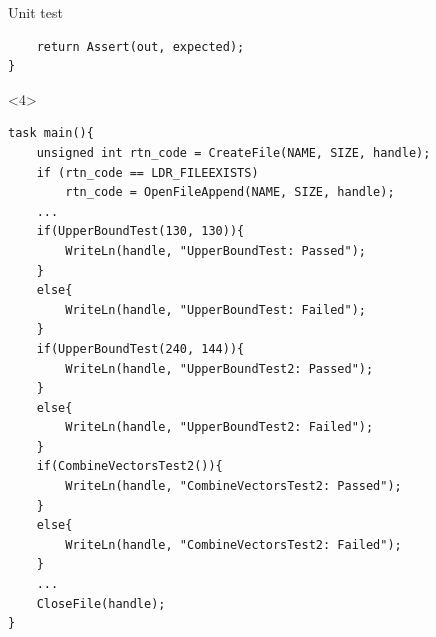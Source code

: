 \begin{frame}[fragile]{Unit test}
\begin{onlyenv}
\begin{center}
\begin{minipage}[H]{0.9\linewidth}
\begin{lstlisting}
  	return Assert(out, expected);
}
\end{lstlisting} 
\end{minipage}
\end{center}
\end{onlyenv}
\begin{onlyenv}<4>
\begin{center}
\begin{minipage}[H]{0.9\linewidth}
\begin{lstlisting}
task main(){
	unsigned int rtn_code = CreateFile(NAME, SIZE, handle);
   	if (rtn_code == LDR_FILEEXISTS)
     	rtn_code = OpenFileAppend(NAME, SIZE, handle);
  	...
 	if(UpperBoundTest(130, 130)){
    	WriteLn(handle, "UpperBoundTest: Passed");
  	}
 	else{
    	WriteLn(handle, "UpperBoundTest: Failed");
  	}
  	if(UpperBoundTest(240, 144)){
    	WriteLn(handle, "UpperBoundTest2: Passed");
  	}
  	else{
    	WriteLn(handle, "UpperBoundTest2: Failed");
  	}
  	if(CombineVectorsTest2()){
    	WriteLn(handle, "CombineVectorsTest2: Passed");
  	}
  	else{
    	WriteLn(handle, "CombineVectorsTest2: Failed");
  	}
  	...
  	CloseFile(handle);
}
\end{lstlisting} 
\end{minipage}
\end{center}
\end{onlyenv}


\end{frame}
